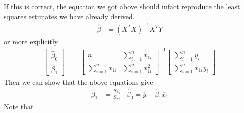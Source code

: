 \documentclass[12 pt]{article}
\begin{document}
If this is correct, the equation we got above should infact reproduce
the least squares estimates we have already derived.
\begin{align*}
  \hat{\beta} & = (X^TX)^{-1}X^TY
\end{align*}
or more explicitly
\begin{align*}
  \begin{bmatrix}
    \hat{\beta}_0 \\ \hat{\beta}_1
  \end{bmatrix} & =
                  \begin{bmatrix}
                    n & \sum_{i=1}^n x_{1i}
                    \\ \sum_{i=1}^n x_{1i} & \sum_{i=1}^n x_{1i}^2
                  \end{bmatrix}^{-1}
                                             \begin{bmatrix}
                                               \sum_{i=1}^n y_i
                                               \\ \sum_{i=1}^n x_{1i}y_i
                                             \end{bmatrix}
\end{align*}
Then we can show that the above equations give
\begin{align*}
  \hat{\beta}_1 & = \frac{S_{xy}}{S_{xx}} & \hat{\beta}_0 = \overline{y} - \hat{\beta}_1 \overline{x}_1
\end{align*}
Note that
\end{document}
